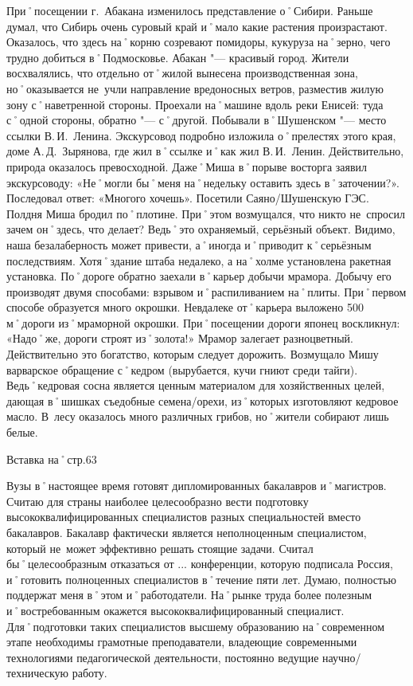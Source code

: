 При˚посещении г.~Абакана изменилось представление о˚Сибири. Раньше думал, что Сибирь очень суровый край и˚мало какие растения произрастают. Оказалось, что здесь на˚корню созревают помидоры, кукуруза на˚зерно, чего трудно добиться в˚Подмосковье. Абакан "--- красивый город. Жители восхвалялись, что отдельно от˚жилой вынесена производственная зона, но˚оказывается не~учли направление вредоносных ветров, разместив жилую зону с˚наветренной стороны. Проехали на˚машине вдоль реки Енисей: туда с˚одной стороны, обратно "--- с˚другой. Побывали в˚Шушенском "--- место ссылки В.\,И.~Ленина. Экскурсовод подробно изложила о˚прелестях этого края, доме А.\,Д.~Зырянова, где жил в˚ссылке и˚как жил В.\,И.~Ленин. Действительно, природа оказалось превосходной. Даже˚Миша в˚порыве восторга заявил экскурсоводу: «Не˚могли бы˚меня на˚недельку оставить здесь в˚заточении?». Последовал ответ: «Многого хочешь». Посетили Саяно\-/Шушенскую ГЭС. Полдня Миша бродил по˚плотине. При˚этом возмущался, что никто не~спросил зачем он˚здесь, что делает? Ведь˚это охраняемый, серьёзный объект. Видимо, наша безалаберность может привести, а˚иногда и˚приводит к˚серьёзным последствиям. Хотя˚здание штаба недалеко, а на˚холме установлена ракетная установка. По˚дороге обратно заехали в˚карьер добычи мрамора. Добычу его производят двумя способами: взрывом и˚распиливанием на˚плиты. При˚первом способе образуется много окрошки. Невдалеке от˚карьера выложено 500\,м˚дороги из˚мраморной окрошки. При˚посещении дороги японец воскликнул: «Надо˚же, дороги строят из˚золота!» Мрамор залегает разноцветный. Действительно это богатство, которым следует дорожить. Возмущало Мишу варварское обращение с˚кедром (вырубается, кучи гниют среди тайги). Ведь˚кедровая сосна является ценным материалом для хозяйственных целей, дающая в˚шишках съедобные семена\-/орехи, из˚которых изготовляют кедровое масло. В~лесу оказалось много различных грибов, но˚жители собирают лишь белые.

Вставка на˚стр.63

Вузы в˚настоящее время готовят дипломированных бакалавров и˚магистров. Считаю для страны наиболее целесообразно вести подготовку высококвалифицированных специалистов разных специальностей вместо бакалавров. Бакалавр фактически является неполноценным специалистом, который не~может эффективно решать стоящие задачи. Считал бы˚целесообразным отказаться от ... конференции, которую подписала Россия, и˚готовить полноценных специалистов в˚течение пяти лет. Думаю, полностью поддержат меня в˚этом и˚работодатели. На˚рынке труда более полезным и˚востребованным окажется высококвалифицированный специалист. Для˚подготовки таких специалистов высшему образованию на˚современном этапе необходимы грамотные преподаватели, владеющие современными технологиями педагогической деятельности, постоянно ведущие научно\-/техническую работу.

